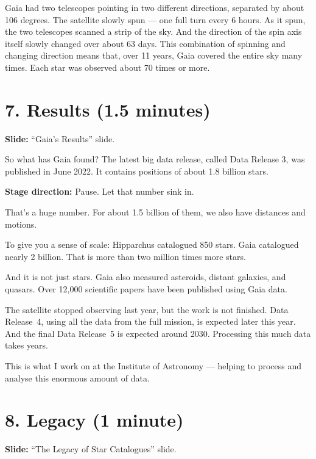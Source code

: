 \documentclass[10pt,a4paper]{article}
\newenvironment{stagenote}
  {\begin{mdframed}[linecolor=blue!50, backgroundcolor=blue!5, linewidth=1pt]%
   \small\color{blue!70!black}\textbf{Stage direction:} }
  {\end{mdframed}}
\newenvironment{slidenote}
  {\begin{mdframed}[linecolor=green!50!black, backgroundcolor=green!5, linewidth=1pt]%
   \small\color{green!40!black}\textbf{Slide:} }
  {\end{mdframed}}
\begin{document}
Gaia had two telescopes pointing in two different directions, separated by about 106 degrees. The satellite slowly spun --- one full turn every 6 hours. As it spun, the two telescopes scanned a strip of the sky. And the direction of the spin axis itself slowly changed over about 63 days. This combination of spinning and changing direction means that, over 11 years, Gaia covered the entire sky many times. Each star was observed about 70 times or more.

\section*{7. Results (1.5 minutes)}

\begin{slidenote}
``Gaia's Results'' slide.
\end{slidenote}

So what has Gaia found? The latest big data release, called Data Release 3, was published in June 2022. It contains positions of about 1.8 billion stars.

\begin{stagenote}
Pause. Let that number sink in.
\end{stagenote}

That's a huge number. For about 1.5 billion of them, we also have distances and motions.

To give you a sense of scale: Hipparchus catalogued 850 stars. Gaia catalogued nearly 2 billion. That is more than two million times more stars.

And it is not just stars. Gaia also measured asteroids, distant galaxies, and quasars. Over 12,000 scientific papers have been published using Gaia data.

The satellite stopped observing last year, but the work is not finished. Data Release~4, using all the data from the full mission, is expected later this year. And the final Data Release~5 is expected around 2030. Processing this much data takes years.

This is what I work on at the Institute of Astronomy --- helping to process and analyse this enormous amount of data.

\section*{8. Legacy (1 minute)}

\begin{slidenote}
``The Legacy of Star Catalogues'' slide.
\end{slidenote}
\end{document}
